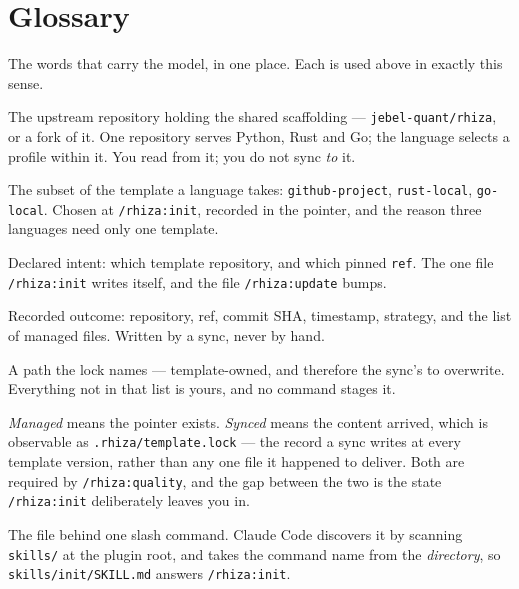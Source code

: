 \documentclass[11pt,a4paper]{article}
\newcommand{\cmd}[1]{\texttt{/rhiza:#1}}
\newcommand{\file}[1]{\texttt{#1}}
\begin{document}
\section{Glossary}

The words that carry the model, in one place. Each is used above in exactly this sense.

\begin{description}[leftmargin=0pt, style=nextline, itemsep=0.3em]
  \item[template repository]
        The upstream repository holding the shared scaffolding ---
        \texttt{jebel-quant/rhiza}, or a fork of it. One repository serves Python, Rust
        and Go; the language selects a profile within it. You read from it; you do not
        sync \emph{to} it.
  \item[profile]
        The subset of the template a language takes: \texttt{github-project},
        \texttt{rust-local}, \texttt{go-local}. Chosen at \cmd{init}, recorded in the
        pointer, and the reason three languages need only one template.
  \item[pointer --- \file{template.yml}]
        Declared intent: which template repository, and which pinned \texttt{ref}. The
        one file \cmd{init} writes itself, and the file \cmd{update} bumps.
  \item[lock --- \file{template.lock}]
        Recorded outcome: repository, ref, commit SHA, timestamp, strategy, and the list
        of managed files. Written by a sync, never by hand.
  \item[managed file]
        A path the lock names --- template-owned, and therefore the sync's to overwrite.
        Everything not in that list is yours, and no command stages it.
  \item[rhiza-managed vs.\ synced]
        \emph{Managed} means the pointer exists. \emph{Synced} means the content
        arrived, which is observable as \file{.rhiza/template.lock} --- the record a
        sync writes at every template version, rather than any one file it happened to
        deliver. Both are required by \cmd{quality}, and the gap between the two is the
        state \cmd{init} deliberately leaves you in.
  \item[skill --- \file{skills/<name>/SKILL.md}]
        The file behind one slash command. Claude Code discovers it by scanning
        \file{skills/} at the plugin root, and takes the command name from the
        \emph{directory}, so \file{skills/init/SKILL.md} answers \cmd{init}.
  \item[procedure --- \file{prompts/}]

\end{description}
\end{document}
